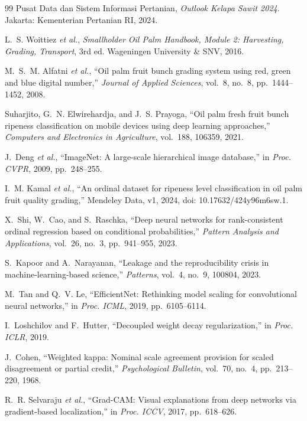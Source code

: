 \documentclass[10pt,a4paper,twocolumn]{article}
\begin{document}
\begin{thebibliography}{99}
\small
{} Pusat Data dan Sistem Informasi Pertanian, \emph{Outlook Kelapa Sawit 2024}. Jakarta: Kementerian Pertanian RI, 2024.

 L.~S. Woittiez \emph{et al.}, \emph{Smallholder Oil Palm Handbook, Module 2: Harvesting, Grading, Transport}, 3rd ed. Wageningen University \& SNV, 2016.

 M.~S.~M. Alfatni \emph{et al.}, ``Oil palm fruit bunch grading system using red, green and blue digital number,'' \emph{Journal of Applied Sciences}, vol.~8, no.~8, pp.~1444--1452, 2008.

 Suharjito, G.~N. Elwirehardja, and J.~S. Prayoga, ``Oil palm fresh fruit bunch ripeness classification on mobile devices using deep learning approaches,'' \emph{Computers and Electronics in Agriculture}, vol.~188, 106359, 2021.

 J.~Deng \emph{et al.}, ``ImageNet: A large-scale hierarchical image database,'' in \emph{Proc. CVPR}, 2009, pp.~248--255.

 I.~M. Kamal \emph{et al.}, ``An ordinal dataset for ripeness level classification in oil palm fruit quality grading,'' Mendeley Data, v1, 2024, doi: 10.17632/424y96m6sw.1.

 X.~Shi, W.~Cao, and S.~Raschka, ``Deep neural networks for rank-consistent ordinal regression based on conditional probabilities,'' \emph{Pattern Analysis and Applications}, vol.~26, no.~3, pp.~941--955, 2023.

 S.~Kapoor and A.~Narayanan, ``Leakage and the reproducibility crisis in machine-learning-based science,'' \emph{Patterns}, vol.~4, no.~9, 100804, 2023.

 M.~Tan and Q.~V. Le, ``EfficientNet: Rethinking model scaling for convolutional neural networks,'' in \emph{Proc. ICML}, 2019, pp.~6105--6114.

 I.~Loshchilov and F.~Hutter, ``Decoupled weight decay regularization,'' in \emph{Proc. ICLR}, 2019.

 J.~Cohen, ``Weighted kappa: Nominal scale agreement provision for scaled disagreement or partial credit,'' \emph{Psychological Bulletin}, vol.~70, no.~4, pp.~213--220, 1968.

 R.~R. Selvaraju \emph{et al.}, ``Grad-CAM: Visual explanations from deep networks via gradient-based localization,'' in \emph{Proc. ICCV}, 2017, pp.~618--626.
\end{thebibliography}
\end{document}
